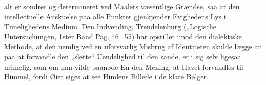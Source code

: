 \documentclass[12pt]{book}
\begin{document}
%
alt er sondret og determineret ved Maalets væsentlige Grændse, saa at den
intellectuelle Anskuelse paa alle Punkter gjenkjender Evighedens Lys i Timelighedens
Medium. Den Indvending, Trendelenburg („Logische Untersuchungen, 1ster Band Pag.
46=55) har opstillet imod den dialektiske Methode, at den nemlig ved en uforsvarlig
Misbrug af Identiteten skulde lægge an paa at forvandle den „slette“ Uendelighed til
den sande, er i sig selv ligesaa urimelig, som om han vilde paanøde En den Mening, at
Havet forvandles til Himmel, fordi Øiet siges at see Himlens Billede i de klare
Bølger.
\end{document}
